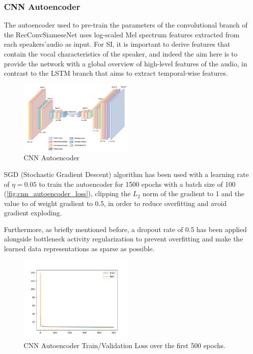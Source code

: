 \subsubsection{CNN Autoencoder}\label{subsec:cnnautoencoder}
The autoencoder used to pre-train the parameters of the convolutional branch of the RecConvSiameseNet uses log-scaled Mel spectrum features extracted from each speakers'audio as input. For SI, it is important to derive features that contain the vocal characteristics of the speaker, and indeed the aim here is to provide the network with a global overview of high-level features of the audio, in contrast to the LSTM branch that aims to extract temporal-wise features.

\begin{figure}
	\includegraphics[width=0.5\textwidth]{images/cnn_autoencoder}
	\caption{CNN Autoencoder}
	\label{fig:cnn_autoencoder}
\end{figure}

SGD (Stochastic Gradient Descent) algorithm has been used with a learning rate of $\eta = 0.05$ to train the autoencoder for 1500 epochs with a batch size of 100 (\vref{fig:cnn_autoencoder_loss}), clipping the $L_2$ norm of the gradient to 1 and the value to of weight gradient to 0.5, in order to reduce overfitting and avoid gradient exploding.

Furthermore, as briefly mentioned before, a dropout rate of 0.5 has been applied alongside bottleneck activity regularization to prevent overfitting and make the learned data representations as sparse as possible.

\begin{figure}
	\includegraphics[width=0.5\textwidth]{images/cnn_autoencoder_graph.png}
	\caption{CNN Autoencoder Train/Validation Loss over  the first 500 epochs.}
	\label{fig:cnn_autoencoder_loss}
\end{figure}

